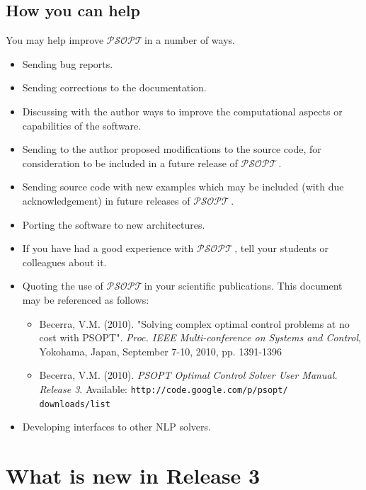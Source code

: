 \documentclass[a4paper,11pt]{report}    %
\newcommand{\psopt}{$\mathcal{PSOPT}$\,}  %
\begin{document}
\subsection{How you can help}

You may help improve \psopt in a number of ways. 

\begin{itemize}
 \item  Sending bug reports.
 \item  Sending corrections to the documentation.
 \item  Discussing with the author ways to improve the computational aspects
        or capabilities  of the software.
 \item  Sending to the author proposed modifications to the source code, for consideration
        to be included in a future release of \psopt.
 \item  Sending source code with new examples which may be included (with due acknowledgement) in future releases of \psopt.
 \item  Porting the software to new architectures.
 \item  If you have had a good experience with \psopt, tell your students or colleagues
about it.
 \item  Quoting the use of \psopt in your scientific publications. This document may be referenced as follows:

\begin{itemize}
\item Becerra, V.M. (2010). "Solving complex optimal control problems at no cost with PSOPT". \textit{Proc. IEEE Multi-conference on Systems and Control}, Yokohama, Japan, September 7-10, 2010, pp. 1391-1396

\item Becerra, V.M. (2010). \textit{PSOPT Optimal Control Solver User Manual. Release 3}.  Available: \texttt{http://code.google.com/p/psopt/\\downloads/list}
\end{itemize}


 \item  Developing interfaces to other NLP solvers.
\end{itemize}



\section{What is new in Release 3}
\end{document}
